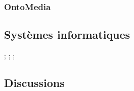 \subsubsection{OntoMedia}
\cite{Lee2012a}

\subsection{Systèmes informatiques}
\cite{Tsinaraki2005} ; \cite{Tsinaraki2004} ; \cite{Dasiopoulou2009} ;


\subsection{Discussions}
\cite{Burger2011}
